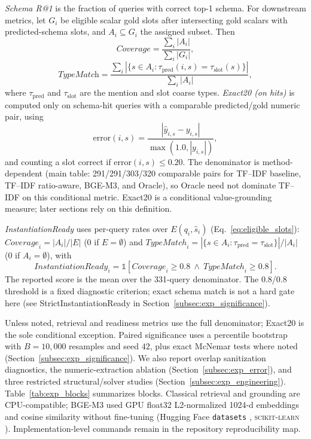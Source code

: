 \documentclass[pdflatex,sn-basic,Numbered]{sn-jnl}
\begin{document}
\textit{Schema R@1} is the fraction of queries with correct top-1 schema. For downstream metrics, let $G_i$ be eligible scalar gold slots after intersecting gold scalars with predicted-schema slots, and $A_i \subseteq G_i$ the assigned subset. Then
\begin{equation}
\textit{Coverage}
=
\frac{\sum_i |A_i|}{\sum_i |G_i|},
\label{eq:coverage}
\end{equation}
\begin{equation}
\textit{TypeMatch}
=
\frac{\sum_i |\{s \in A_i : \tau_{\mathrm{pred}}(i,s) = \tau_{\mathrm{slot}}(s)\}|}{\sum_i |A_i|},
\label{eq:typematch}
\end{equation}
where $\tau_{\mathrm{pred}}$ and $\tau_{\mathrm{slot}}$ are the mention and slot coarse types. \textit{Exact20 (on hits)} is computed only on schema-hit queries with a comparable predicted/gold numeric pair, using
\begin{equation}
\mathrm{error}(i,s) = \frac{|\hat{y}_{i,s} - y_{i,s}|}{\max(1.0, |y_{i,s}|)},
\label{eq:bounded_error}
\end{equation}
and counting a slot correct if $\mathrm{error}(i,s) \leq 0.20$. The denominator is method-dependent (main table: 291/291/303/320 comparable pairs for TF--IDF baseline, TF--IDF ratio-aware, BGE-M3, and Oracle), so Oracle need not dominate TF--IDF on this conditional metric. Exact20 is a conditional value-grounding measure; later sections rely on this definition.

\textit{InstantiationReady} uses per-query rates over $E(q_i,\hat{s}_i)$ (Eq.~\eqref{eq:eligible_slots}): $\mathit{Coverage}_i = |A_i|/|E|$ (0 if $E=\emptyset$) and $\mathit{TypeMatch}_i = |\{s\in A_i:\tau_{\mathrm{pred}}=\tau_{\mathrm{slot}}\}|/|A_i|$ (0 if $A_i=\emptyset$), with
\begin{equation}
\mathit{InstantiationReady}_i = \mathbb{1}\!\left[\mathit{Coverage}_i \geq 0.8 \ \wedge\ \mathit{TypeMatch}_i \geq 0.8\right].
\label{eq:instantiation_ready}
\end{equation}
The reported score is the mean over the 331-query denominator. The 0.8/0.8 threshold is a fixed diagnostic criterion; exact schema match is not a hard gate here (see StrictInstantiationReady in Section~\ref{subsec:exp_significance}).

Unless noted, retrieval and readiness metrics use the full denominator; Exact20 is the sole conditional exception. Paired significance uses a percentile bootstrap with $B=10{,}000$ resamples and seed $42$, plus exact McNemar tests where noted (Section~\ref{subsec:exp_significance}). We also report overlap sanitization diagnostics, the numeric-extraction ablation (Section~\ref{subsec:exp_error}), and three restricted structural/solver studies (Section~\ref{subsec:exp_engineering}). Table~\ref{tab:exp_blocks} summarizes blocks. Classical retrieval and grounding are CPU-compatible; BGE-M3 used GPU float32 L2-normalized 1024-d embeddings and cosine similarity without fine-tuning (Hugging Face \texttt{datasets} \cite{lhoest2021datasets}, \textsc{scikit-learn} \cite{pedregosa2011sklearn}). Implementation-level commands remain in the repository reproducibility map.
\end{document}
